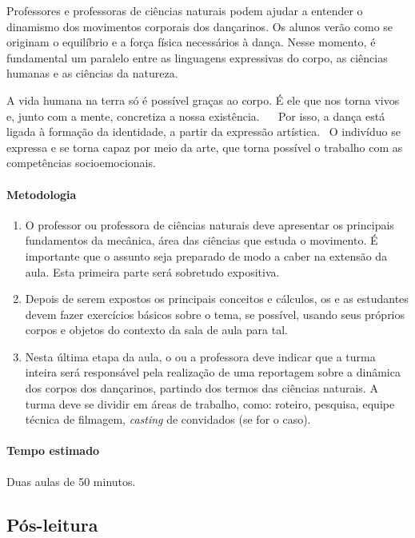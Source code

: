 \documentclass[12pt]{extarticle}
\begin{document}
Professores e professoras de ciências naturais podem ajudar a
entender o dinamismo dos movimentos corporais dos dançarinos. Os alunos verão
como se originam o equilíbrio e a força física necessários à dança. Nesse momento, é fundamental
um paralelo entre as linguagens expressivas do corpo, as ciências humanas e as
ciências da natureza. 

A vida humana na terra só é possível graças ao corpo. É
ele que nos torna vivos e, junto com a mente, concretiza a nossa existência.   
Por isso, a dança está ligada à formação da identidade, a partir da expressão
artística.  O indivíduo se expressa e se torna capaz por meio da arte, que
torna possível o trabalho com as competências socioemocionais.

\paragraph{Metodologia}

\begin{enumerate}

  \item
  O professor ou professora de ciências naturais deve apresentar os 
  principais fundamentos da mecânica, área das ciências que estuda
  o movimento. É importante que o assunto seja preparado de modo
  a caber na extensão da aula. Esta primeira parte será sobretudo expositiva.

  \item
  Depois de serem expostos os principais conceitos e cálculos,
  os e as estudantes devem fazer exercícios básicos sobre o tema, 
  se possível, usando seus próprios corpos e objetos do contexto
  da sala de aula para tal. 

  \item
  Nesta última etapa da aula, o ou a professora deve indicar que a turma inteira
  será responsável pela realização de uma reportagem sobre a dinâmica dos 
  corpos dos dançarinos, partindo dos termos das ciências naturais. A turma deve
  se dividir em áreas de trabalho, como: roteiro, pesquisa, equipe técnica de
  filmagem, \textit{casting} de convidados (se for o caso).

\end{enumerate}

\paragraph{Tempo estimado} Duas aulas de 50 minutos.


\subsection{Pós-leitura}
\end{document}
